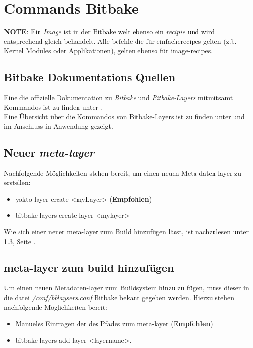 \chapter{Commands Bitbake}%
\label{cha:commands_bitbake}

\textbf{NOTE}: Ein \textit{Image} ist in der Bitbake welt ebenso
ein \textit{recipie} und wird entsprechend gleich behandelt. Alle befehle die
für \glq einfache\grq recipes gelten (z.b. Kernel Modules oder Applikationen),
gelten ebenso für image-recipes.


\section{Bitbake Dokumentations Quellen}%
\label{sec:bitbake_quellen}
Eine die offizielle Dokumentation zu \textit{Bitbake} und
\textit{Bitbake-Layers} mitmitsamt Kommandos ist zu finden unter
\cite{Yocto:Bitbake_Manual}.\\

Eine Übersicht über die Kommandos von Bitbake-Layers  ist zu finden unter
\cite[156]{Gonzalez2018:Embedded_Linux_Development_Using_Yocto_Project_Cookbook_2nd}
und im Anschluss in Anwendung gezeigt.


\section{Neuer \textit{meta-layer}}%
\label{sec:_a_new_recipes}
Nachfolgende Möglichkeiten stehen bereit, um einen neuen Meta-daten layer zu
erstellen:
\begin{itemize}
    \item yokto-layer create <myLayer> (\textbf{Empfohlen})
    \item bitbake-layers create-layer <mylayer>
\end{itemize}

Wie sich einer neuer meta-layer zum Build hinzufügen lässt, ist nachzulesen
unter \ref{sec:meta_layer_zum_build_hinzufugen}, Seite
\pageref{sec:meta_layer_zum_build_hinzufugen}.

\section{meta-layer zum build hinzufügen}%
\label{sec:meta_layer_zum_build_hinzufugen}
Um einen neuen Metadaten-layer zum Buildsystem hinzu zu fügen, muss dieser in
die datei \textit{/conf/bblaysers.conf} Bitbake bekant gegeben werden. Hierzu
stehen nachfolgende Möglichkeiten bereit:
\begin{itemize}
    \item Manueles Eintragen der des Pfades zum meta-layer (\textbf{Empfohlen})
    \item bitbake-layers add-layer <layername>.
\end{itemize}



